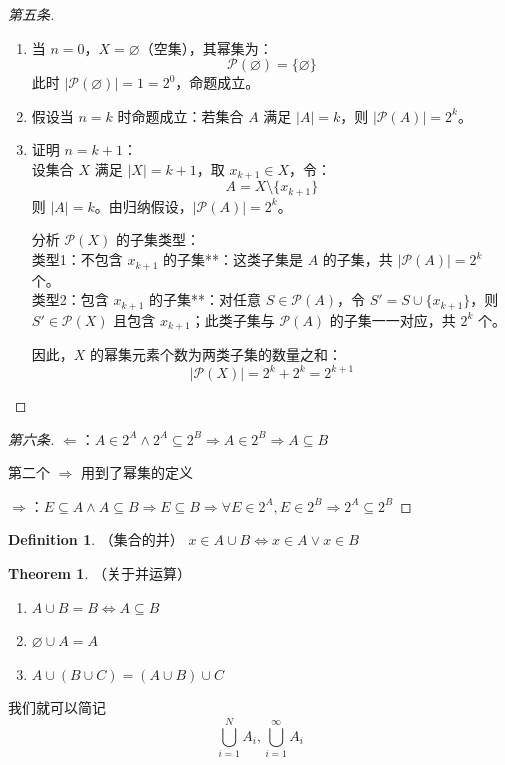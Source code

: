 \documentclass[oneside]{book}
\theoremstyle{definition}
\newtheorem{definition}{Definition}[section]
\newtheorem{theorem}{Theorem}[section]
\begin{document}
		\begin{proof}[第五条]
		\begin{enumerate}
			\item 
			当 \( n = 0 \)，\( X = \varnothing \)（空集），其幂集为：
			\[
			\mathcal{P}(\varnothing) = \{\varnothing\}
			\]
			此时 \( |\mathcal{P}(\varnothing)| = 1 = 2^0 \)，命题成立。
			\item 假设当 \( n = k \) 时命题成立：若集合 \( A \) 满足 \( |A| = k \)，则 \( |\mathcal{P}(A)| = 2^k \)。
			\item 证明 \( n = k+1 \)：\\
			设集合 \( X \) 满足 \( |X| = k+1 \)，取 \( x_{k+1} \in X \)，令：
			\[
			A = X \setminus \{x_{k+1}\}
			\]
			则 \( |A| = k \)。由归纳假设，\( |\mathcal{P}(A)| = 2^k \)。
			
			
			分析 \( \mathcal{P}(X) \) 的子集类型：\\
			类型1：不包含 \( x_{k+1} \) 的子集**：这类子集是 \( A \) 的子集，共 \( |\mathcal{P}(A)| = 2^k \) 个。\\
			类型2：包含 \( x_{k+1} \) 的子集**：对任意 \( S \in \mathcal{P}(A) \)，令 \( S' = S \cup \{x_{k+1}\} \)，则 \( S' \in \mathcal{P}(X) \) 且包含 \( x_{k+1} \)；此类子集与 \( \mathcal{P}(A) \) 的子集一一对应，共 \( 2^k \) 个。
			
			
			因此，\( X \) 的幂集元素个数为两类子集的数量之和：
			\[
			|\mathcal{P}(X)| = 2^k + 2^k = 2^{k+1}
			\]
		\end{enumerate}
\end{proof}
		
		\begin{proof}[第六条]
			$\Leftarrow$：$A\in 2^A\land 2^A\subseteq 2^B\Rightarrow A\in 2^B\Rightarrow A\subseteq B$
			
			第二个 $\Rightarrow$ 用到了幂集的定义
			
			$\Rightarrow$：$E\subseteq A\land A\subseteq B\Rightarrow E\subseteq B \Rightarrow\forall E\in 2^A,E\in 2^B\Rightarrow 2^A\subseteq 2^B$
		\end{proof}
		
		\begin{definition}
			（集合的并）
			$x\in A\cup B\Leftrightarrow x\in A\lor x\in B$
		\end{definition}
		
		\begin{theorem}
			（关于并运算）
			\begin{enumerate}
				\item $A\cup B=B\Leftrightarrow A\subseteq B$
				\item $\varnothing\cup A=A$
				\item $A\cup \left(B\cup C\right)=\left(A\cup B\right)\cup C$
			\end{enumerate}
			我们就可以简记
			$$\bigcup_{i=1}^N A_i,\bigcup_{i=1}^\infty A_i$$
		\end{theorem}
		
\end{document}

